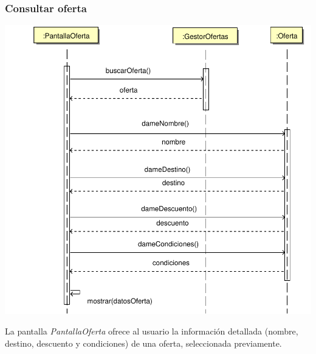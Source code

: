 \documentclass[11pt, a4paper, twoside, titlepage]{article}
\begin{document}
			\subsubsection{Consultar oferta}
				\begin{center}
					\includegraphics[scale=.7]{diseno/diagramas/consultaroferta.pdf}
				\end{center}
				La pantalla {\itshape PantallaOferta} ofrece al usuario la información detallada (nombre, destino, descuento y condiciones) de una oferta, seleccionada previamente.
\end{document}
